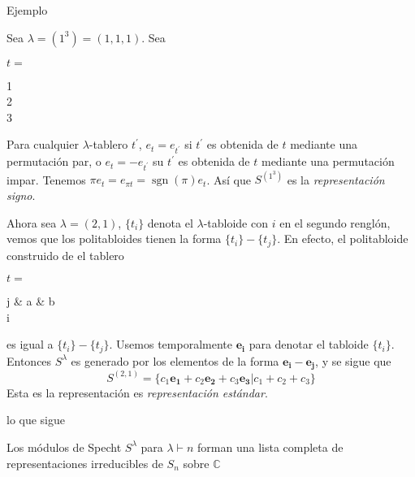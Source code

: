 \documentclass[final,xcolor=svgnames]{beamer}
\DeclareMathOperator{\sgn}{sgn}
\begin{document}
\begin{frame}{}
\begin{columns}
\begin{column}{0.5\textwidth}
\begin{block}{Ejemplo}
\begin{scriptsize}
            Sea $\lambda=(1^{3})=(1,1,1)$. Sea
            \begin{center}$t=$
              \begin{ytableau}
                1\\
                2\\
                3
              \end{ytableau}
            \end{center}
            Para cualquier $\lambda$-tablero $t^{'}$,
            $e_{t}=e_{t^{'}}$ si $t^{'}$ es obtenida de $t$ mediante
            una permutación par, o $e_{t}=-e_{t^{'}}$ su $t^{'}$ es
            obtenida de $t$ mediante una permutación impar. Tenemos $\pi
            e_{t}=e_{\pi t}=\sgn(\pi)e_{t}$. Así que $S^{(1^{3})}$ es la
            \textit{representación signo}.
         
         Ahora sea $\lambda=(2,1)$, $\{t_{i}\}$ denota el $\lambda$-tabloide
         con $i$ en el segundo renglón, vemos que los politabloides tienen la
         forma  $\{t_{i}\}- \{t_{j}\}$. En efecto, el politabloide construido
         de el tablero
         \begin{center}$t=$
           \begin{ytableau}
             j & a & b \\
             i\\
           \end{ytableau}
         \end{center}
         es igual a $\{t_{i}\}- \{t_{j}\}$. Usemos temporalmente
         $\boldsymbol{e_{i}}$ para denotar el tabloide $\{t_{i}\}$. Entonces
         $S^{\lambda}$ es generado por los elementos de la forma
         $\boldsymbol{e_{i}}-\boldsymbol{e_{j}}$, y se sigue que
         $$S^{(2,1)}=\{c_{1}\boldsymbol{e_{1}}+c_{2}\boldsymbol{e_{2}}+c_{3}\boldsymbol{e_{3}}|c_{1}+c_{2}+c_{3}\}$$ 
         Esta es la representación es \textit{representación estándar}. 
       \end{scriptsize}
     \end{block}
     \begin{block}{lo que sigue}
       \begin{scriptsize}         
         Los módulos de Specht $S^{\lambda}$ para $\lambda\vdash n$ forman
         una lista completa de representaciones irreducibles de $S_{n}$ sobre $\mathbb{C}$
         

\end{scriptsize}
\end{block}
\end{column}
\end{columns}
\end{frame}
\end{document}
